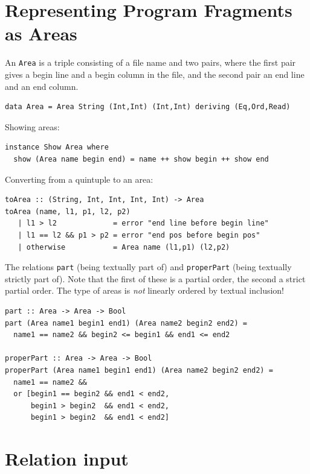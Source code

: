 \documentclass[11pt]{article}
\newlength{\fminilength}
\newenvironment{fminipage}[1][\linewidth]
 {\setlength{\fminilength}{#1-2\fboxsep-2\fboxrule-1em}%
  \bigskip\begin{lrbox}{\fminibox}\quad\begin{minipage}{\fminilength}\bigskip}
 {\smallskip\end{minipage}\end{lrbox}\noindent\fbox{\usebox{\fminibox}}\bigskip}
\newcommand{\bc}{\begin{fminipage}}
\newcommand{\ec}{\end{fminipage}}
\begin{document}
\section{Representing Program Fragments as Areas} 

An \verb^Area^ is a triple consisting of a file name and two pairs, 
where the first pair gives a begin line and a begin column in the file, 
and the second pair an end line and an end column. 

\bc\begin{verbatim}
data Area = Area String (Int,Int) (Int,Int) deriving (Eq,Ord,Read)
\end{verbatim}\ec

Showing areas: 

\bc\begin{verbatim} 
instance Show Area where 
  show (Area name begin end) = name ++ show begin ++ show end
\end{verbatim}\ec

Converting from a quintuple to an area: 

\bc\begin{verbatim}
toArea :: (String, Int, Int, Int, Int) -> Area
toArea (name, l1, p1, l2, p2) 
   | l1 > l2             = error "end line before begin line"
   | l1 == l2 && p1 > p2 = error "end pos before begin pos"
   | otherwise           = Area name (l1,p1) (l2,p2)
\end{verbatim}\ec

The relations \verb^part^ (being textually part of) 
and \verb^properPart^ (being textually strictly part of). 
Note that the first of these is a partial order, the second a 
strict partial order. The type of areas is {\em not} linearly ordered
by textual inclusion! 

\bc\begin{verbatim} 
part :: Area -> Area -> Bool
part (Area name1 begin1 end1) (Area name2 begin2 end2) = 
  name1 == name2 && begin2 <= begin1 && end1 <= end2

properPart :: Area -> Area -> Bool
properPart (Area name1 begin1 end1) (Area name2 begin2 end2) = 
  name1 == name2 && 
  or [begin1 == begin2 && end1 < end2, 
      begin1 > begin2  && end1 < end2, 
      begin1 > begin2  && end1 < end2]
\end{verbatim}\ec

\section{Relation input}
\end{document}
